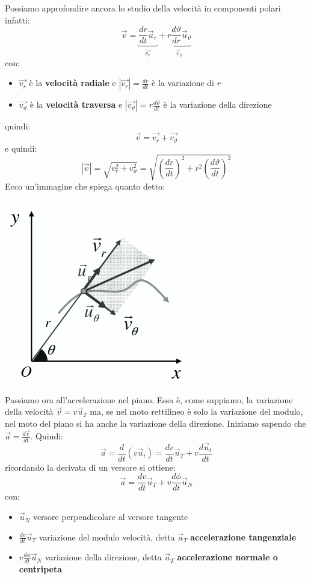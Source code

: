 \documentclass[a4paper,12pt, oneside]{book}
\begin{document}
Possiamo approfondire ancora lo studio della velocità in componenti polari infatti:
$$\vec{v}=\underbrace{\frac{dr}{dt} \vec{u}_r}_{\vec{v_r}}+\underbrace{r\frac{d\vartheta}{dr}\vec{u}_\vartheta}_{\vec{v}_\vartheta}$$
con:
\begin{itemize}
\item $\vec{v_r}$ è la \textbf{velocità radiale} e $|\vec{v_r}|=\frac{dr}{dt}$  è la variazione di $r$
\item $\vec{v_\vartheta}$ è la \textbf{velocità traversa} e $|\vec{v_\vartheta}|=r\frac{d\vartheta}{dt}$ è la variazione della direzione
\end{itemize}
quindi:
$$\vec{v}=\vec{v_r}+\vec{v_\vartheta}$$
e quindi:
$$|\vec{v}|=\sqrt{v_r^2+v_\vartheta^2}=\sqrt{\left(\frac{dr}{dt}\right)^2+r^2\left(\frac{d\vartheta}{dt}\right)^2}$$
\newpage
Ecco un'immagine che spiega quanto detto:
\begin{center}
\includegraphics[scale=0.5]{img/pia7.png}
\end{center}
Passiamo ora all'accelerazione nel piano. Essa è, come sappiamo, la variazione della velocità $\vec{v}=v\vec{u}_T$ ma, se nel moto rettilineo è solo la variazione del modulo, nel moto del piano si ha anche la variazione della direzione. Iniziamo sapendo che $\vec{a}=\frac{d\vec{v}}{dt}$. Quindi:
$$\vec{a}=\frac{d}{dt}(v\vec{u}_t)=\frac{dv}{dt}\vec{u}_T+v\frac{d\vec{u}_t}{dt}$$
ricordando la derivata di un versore si ottiene:
$$\vec{a}=\frac{dv}{dt}\vec{u}_T+v\frac{d\phi}{dt}\vec{u}_N$$
con:
\begin{itemize}
\item $\vec{u}_N$ versore perpendicolare al versore tangente
\item $\frac{dv}{dt}\vec{u}_T$ variazione del modulo velocità, detta $\vec{a}_T$ \textbf{accelerazione tangenziale}
\item $v\frac{d\phi}{dt}\vec{u}_N$ variazione della direzione, detta $\vec{a}_T$ \textbf{accelerazione normale o centripeta}
\end{itemize}
\end{document}
